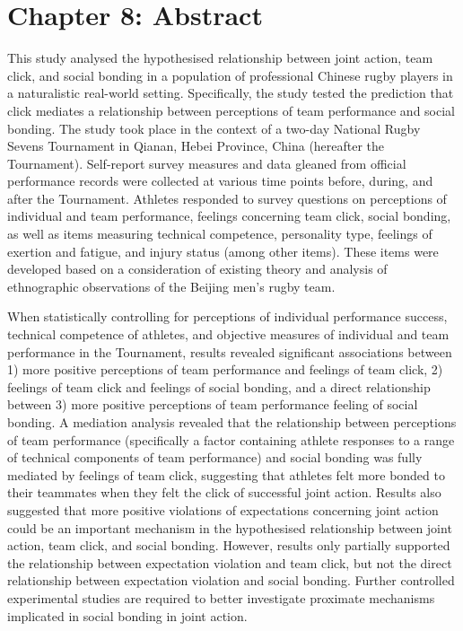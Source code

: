 
\chapter*{Chapter 8: Abstract}



This study analysed the hypothesised relationship between joint action, team click, and social bonding in a population of professional Chinese rugby players in a naturalistic real-world setting.  Specifically, the study tested the prediction that click mediates a relationship between perceptions of team performance and social bonding.  The study took place in the context of a two-day National Rugby Sevens Tournament in Qianan, Hebei Province, China (hereafter the Tournament).  Self-report survey measures and data gleaned from official performance records were collected at various time points before, during, and after the Tournament.  Athletes responded to survey questions on perceptions of individual and team performance, feelings concerning team click, social bonding, as well as items measuring technical competence, personality type, feelings of exertion and fatigue, and injury status (among other items). These items were developed based on a consideration of existing theory and analysis of ethnographic observations of the Beijing men's rugby team.

When statistically controlling for perceptions of individual performance success, technical competence of athletes, and objective measures of individual and team performance in the Tournament, results revealed significant associations between 1) more positive perceptions of team performance and feelings of team click, 2) feelings of team click and feelings of social bonding, and a direct relationship between 3) more positive perceptions of team performance feeling of social bonding.  A mediation analysis revealed that the relationship between perceptions of team performance (specifically a factor containing athlete responses to a range of technical components of team performance) and social bonding was fully mediated by feelings of team click, suggesting that athletes felt more bonded to their teammates when they felt the click of successful joint action. Results also suggested that more positive violations of expectations concerning joint action could be an important mechanism in the hypothesised relationship between joint action, team click, and social bonding. However, results only partially supported the relationship between expectation violation and team click, but not the direct relationship between expectation violation and social bonding. Further controlled experimental studies are required to better investigate proximate mechanisms implicated in social bonding in joint action.

